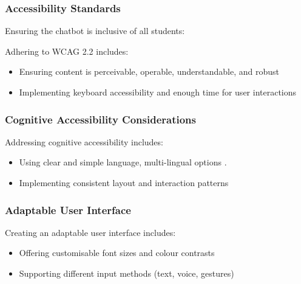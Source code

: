 \documentclass[14pt,a4paper]{article}
\begin{document}
\begin{multicols}{2}
\subsubsection{Accessibility Standards}
Ensuring the chatbot is inclusive of all students:

Adhering to WCAG 2.2 \textit{\parencite{W3C2023}} includes:
\begin{itemize}
    \item Ensuring content is perceivable, operable, understandable, and robust
    \item Implementing keyboard accessibility and enough time for user interactions
\end{itemize}


\subsubsection*{Cognitive Accessibility Considerations}
Addressing cognitive accessibility \textit{\parencite[pp. 1-10]{Yesilada2023}} includes:
\begin{itemize}
    \item Using clear and simple language, multi-lingual options \textit{\parencite[pp. 50-100]{AnastasiouSchaler2023}}.
    \item Implementing consistent layout and interaction patterns
\end{itemize}

\subsubsection*{Adaptable User Interface}
Creating an adaptable user interface \textit{\parencite[pp. 20-50]{HarperYesilada2024}} includes:
\begin{itemize}
    \item Offering customisable font sizes and colour contrasts
    \item Supporting different input methods (text, voice, gestures)
\end{itemize}


\end{multicols}
\end{document}
